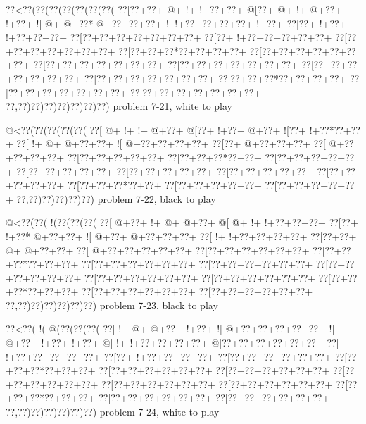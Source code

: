 \vbox{\vbox{\goo
\0??<\0??(\0??(\0??(\0??(\0??(\0??(\0??(
\0??[\0??+\0??+\- @+\- !+\- !+\0??+\0??+
\- @[\0??+\- @+\- !+\- @+\0??+\- !+\0??+
\- ![\- @+\- @+\0??*\- @+\0??+\0??+\0??+
\- ![\- !+\0??+\0??+\0??+\0??+\- !+\0??+
\0??[\0??+\- !+\0??+\- !+\0??+\0??+\0??+
\0??[\0??+\0??+\0??+\0??+\0??+\0??+\0??+
\0??[\0??+\- !+\0??+\0??+\0??+\0??+\0??+
\0??[\0??+\0??+\0??+\0??+\0??+\0??+\0??+
\0??[\0??+\0??+\0??*\0??+\0??+\0??+\0??+
\0??[\0??+\0??+\0??+\0??+\0??+\0??+\0??+
\0??[\0??+\0??+\0??+\0??+\0??+\0??+\0??+
\0??[\0??+\0??+\0??+\0??+\0??+\0??+\0??+
\0??[\0??+\0??+\0??+\0??+\0??+\0??+\0??+
\0??[\0??+\0??+\0??+\0??+\0??+\0??+\0??+
\0??[\0??+\0??+\0??*\0??+\0??+\0??+\0??+
\0??[\0??+\0??+\0??+\0??+\0??+\0??+\0??+
\0??[\0??+\0??+\0??+\0??+\0??+\0??+\0??+
\0??,\0??)\0??)\0??)\0??)\0??)\0??)\0??)
}
\hfil problem 7-21, white to play\hfil\break
}

\vbox{\vbox{\goo
\- @<\0??(\0??(\0??(\0??(\0??(
\0??[\- @+\- !+\- !+\- @+\0??+
\- @[\0??+\- !+\0??+\- @+\0??+
\- ![\0??+\- !+\0??*\0??+\0??+
\0??[\- !+\- @+\- @+\0??+\0??+
\- ![\- @+\0??+\0??+\0??+\0??+
\0??[\0??+\- @+\0??+\0??+\0??+
\0??[\- @+\0??+\0??+\0??+\0??+
\0??[\0??+\0??+\0??+\0??+\0??+
\0??[\0??+\0??+\0??*\0??+\0??+
\0??[\0??+\0??+\0??+\0??+\0??+
\0??[\0??+\0??+\0??+\0??+\0??+
\0??[\0??+\0??+\0??+\0??+\0??+
\0??[\0??+\0??+\0??+\0??+\0??+
\0??[\0??+\0??+\0??+\0??+\0??+
\0??[\0??+\0??+\0??*\0??+\0??+
\0??[\0??+\0??+\0??+\0??+\0??+
\0??[\0??+\0??+\0??+\0??+\0??+
\0??,\0??)\0??)\0??)\0??)\0??)
}
\hfil problem 7-22, black to play\hfil\break
}

\vbox{\vbox{\goo
\- @<\0??(\0??(\- !(\0??(\0??(\0??(
\0??[\- @+\0??+\- !+\- @+\- @+\0??+
\- @[\- @+\- !+\- !+\0??+\0??+\0??+
\0??[\0??+\- !+\0??*\- @+\0??+\0??+
\- ![\- @+\0??+\- @+\0??+\0??+\0??+
\0??[\- !+\- !+\0??+\0??+\0??+\0??+
\0??[\0??+\0??+\- @+\- @+\0??+\0??+
\0??[\- @+\0??+\0??+\0??+\0??+\0??+
\0??[\0??+\0??+\0??+\0??+\0??+\0??+
\0??[\0??+\0??+\0??*\0??+\0??+\0??+
\0??[\0??+\0??+\0??+\0??+\0??+\0??+
\0??[\0??+\0??+\0??+\0??+\0??+\0??+
\0??[\0??+\0??+\0??+\0??+\0??+\0??+
\0??[\0??+\0??+\0??+\0??+\0??+\0??+
\0??[\0??+\0??+\0??+\0??+\0??+\0??+
\0??[\0??+\0??+\0??*\0??+\0??+\0??+
\0??[\0??+\0??+\0??+\0??+\0??+\0??+
\0??[\0??+\0??+\0??+\0??+\0??+\0??+
\0??,\0??)\0??)\0??)\0??)\0??)\0??)
}
\hfil problem 7-23, black to play\hfil\break
}

\vbox{\vbox{\goo
\0??<\0??(\- !(\- @(\0??(\0??(\0??(
\0??[\- !+\- @+\- @+\0??+\- !+\0??+
\- ![\- @+\0??+\0??+\0??+\0??+\0??+
\- ![\- @+\0??+\- !+\0??+\- !+\0??+
\- @[\- !+\- !+\0??+\0??+\0??+\0??+
\- @[\0??+\0??+\0??+\0??+\0??+\0??+
\0??[\- !+\0??+\0??+\0??+\0??+\0??+
\0??[\0??+\- !+\0??+\0??+\0??+\0??+
\0??[\0??+\0??+\0??+\0??+\0??+\0??+
\0??[\0??+\0??+\0??*\0??+\0??+\0??+
\0??[\0??+\0??+\0??+\0??+\0??+\0??+
\0??[\0??+\0??+\0??+\0??+\0??+\0??+
\0??[\0??+\0??+\0??+\0??+\0??+\0??+
\0??[\0??+\0??+\0??+\0??+\0??+\0??+
\0??[\0??+\0??+\0??+\0??+\0??+\0??+
\0??[\0??+\0??+\0??*\0??+\0??+\0??+
\0??[\0??+\0??+\0??+\0??+\0??+\0??+
\0??[\0??+\0??+\0??+\0??+\0??+\0??+
\0??,\0??)\0??)\0??)\0??)\0??)\0??)
}
\hfil problem 7-24, white to play\hfil\break
}

